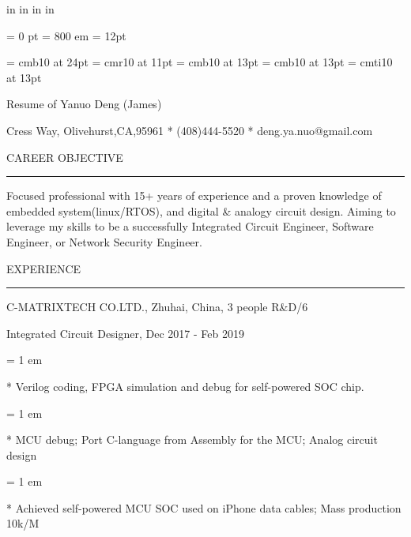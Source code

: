 

 in     %
 in    %
 in  %
 in  %


\nopagenumbers

\parindent = 0 pt
\emergencystretch = 800 em
\baselineskip = 12pt


\font\FFaa=      cmb10            at 24pt
\font\FFbb=      cmr10            at 11pt
\font\FFcc=      cmb10            at 13pt
\font\FFdd=      cmb10            at 13pt
\font\FFee=      cmti10           at 13pt


\bigbreak

\centerline{ \FFaa
Resume of Yanuo Deng (James)
}

\centerline{  Cress Way, Olivehurst,CA,95961
*
(408)444-5520
*
deng.ya.nuo@gmail.com
}

{ \medbreak } { \FFcc
CAREER OBJECTIVE
}

{ \smallbreak } {\par\noindent\hrule} { \smallbreak }

    Focused professional with 15+ years of experience
and a proven knowledge of embedded system(linux/RTOS),
and digital \& analogy circuit design.
    Aiming to leverage my skills to be a successfully
Integrated Circuit Engineer,
Software Engineer,
or Network Security Engineer.

{ \medbreak } { \FFcc
EXPERIENCE
}
{ \smallbreak } {\par\noindent\hrule} { \smallbreak }

{ \medbreak } { \FFdd
C-MATRIXTECH CO.LTD., Zhuhai, China, 3 people R\&D/6
}

{ \FFee
Integrated Circuit Designer, Dec 2017 - Feb 2019
}

{ \parindent = 1 em \item{*}
 Verilog coding, FPGA simulation and debug for self-powered SOC chip.
}

{ \parindent = 1 em \item{*}
 MCU debug; Port C-language from Assembly for the MCU; Analog circuit design
}
{ \parindent = 1 em \item{*}
 Achieved self-powered MCU SOC used on iPhone data cables; Mass production 10k/M
}


